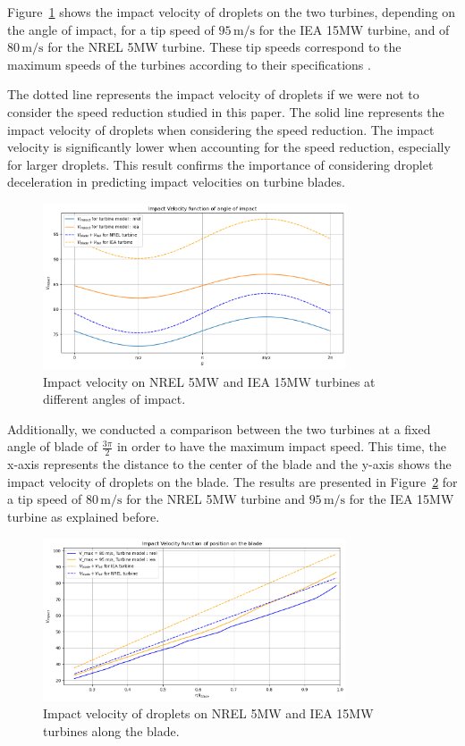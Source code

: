 \documentclass[10pt]{report}
\begin{document}
Figure~\ref{fig:impact_velocity} shows the impact velocity of droplets on the two turbines, depending on the angle of impact, for a tip speed of \(95 \, \text{m/s}\) for the IEA 15MW turbine, and of \(80 \, \text{m/s}\) for the NREL 5MW turbine. These tip speeds correspond to the maximum speeds of the turbines according to their specifications \cite{NREL2009} \cite{IEA2020}.

The dotted line represents the impact velocity of droplets if we were not to consider the speed reduction studied in this paper. The solid line represents the impact velocity of droplets when considering the speed reduction. The impact velocity is significantly lower when accounting for the speed reduction, especially for larger droplets. This result confirms the importance of considering droplet deceleration in predicting impact velocities on turbine blades.
\begin{figure}[H]
    \centering
    \includegraphics[width=0.8\textwidth]{figures/turbine_comp_angle.png}
    \caption{Impact velocity on NREL 5MW and IEA 15MW turbines at different angles of impact.}
    \label{fig:impact_velocity}
\end{figure}

Additionally, we conducted a comparison between the two turbines at a fixed angle of blade of $\frac{3 \pi}{2}$ in order to have the maximum impact speed. This time, the x-axis represents the distance to the center of the blade and the y-axis shows the impact velocity of droplets on the blade. The results are presented in Figure~\ref{fig:impact_velocity_comp} for a tip speed of \(80 \, \text{m/s}\) for the NREL 5MW turbine and \(95 \, \text{m/s}\) for the IEA 15MW turbine as explained before.

\begin{figure}[H]
    \centering
    \includegraphics[width=0.8\textwidth]{figures/turbine_comp.png}
    \caption{Impact velocity of droplets on NREL 5MW and IEA 15MW turbines along the blade.}
    \label{fig:impact_velocity_comp}
\end{figure}
\end{document}
